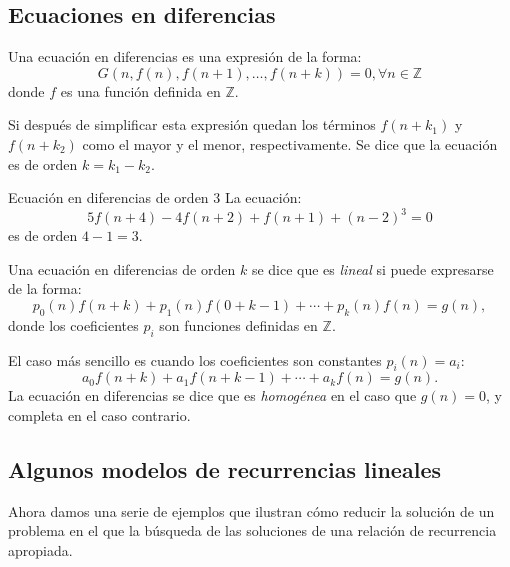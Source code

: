\subsection{Ecuaciones en diferencias}
Una ecuación en diferencias es una expresión de la forma: \[ G\left(n,f(n),f(n+1),\ldots,f(n+k)\right)=0,\forall n\in\mathds{Z} \] donde $f$ es una función definida en $\mathds{Z}$.

Si después de simplificar esta expresión quedan los términos $f\left(n+k_{1}\right)$ y $f\left(n+k_{2}\right)$ como el mayor y el menor, respectivamente. Se dice que la ecuación es de orden $k=k_{1}-k_{2}$.
\begin{example}{Ecuación en diferencias de orden $3$}
	La ecuación:
	\begin{equation}
	5f(n+4)-4f(n+2)+f(n+1)+(n-2)^{3}=0
	\end{equation}
	es de orden $4-1=3$.
\end{example}
Una ecuación en diferencias de orden $k$ se dice que es \emph{lineal} si puede expresarse de la forma:
\begin{equation*}
p_{0}(n)f(n+k)+p_{1}(n)f(0+k-1)+\cdots+p_{k}(n)f(n)=g(n),
\end{equation*}
donde los coeficientes $p_{i}$ son funciones definidas en $\mathds{Z}$.

El caso más sencillo es cuando los coeficientes son constantes $p_{i}(n)=a_{i}$:
\begin{equation*}
a_{0}f(n+k)+a_{1}f(n+k-1)+\cdots+a_{k}f(n)=g(n).
\end{equation*}
La ecuación en diferencias se dice que es \emph{homogénea} en el caso que $g(n)=0$, y completa en el caso contrario.

\subsection{Algunos modelos de recurrencias lineales}

Ahora damos una serie de ejemplos que ilustran cómo reducir la solución de un problema en el que la búsqueda de las soluciones de una relación de recurrencia apropiada.


